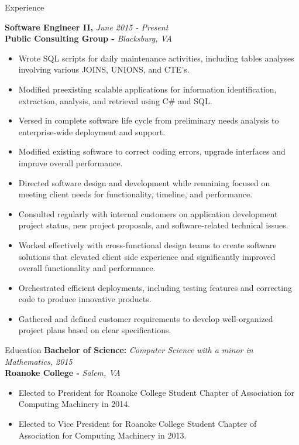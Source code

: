 \documentclass{resume} %
\begin{document}
\begin{rSection}{Experience}

{\bf Software Engineer II, }{\em June 2015 - Present} 
\\
{\bf Public Consulting Group -  }{\em Blacksburg, VA}
\begin{itemize}
\item Wrote SQL scripts for daily maintenance activities, including tables analyses involving various JOINS, UNIONS, and CTE's.
\item Modified preexisting scalable applications for information identification, extraction, analysis, and retrieval using C\# and SQL.
\item Versed in complete software life cycle from preliminary needs analysis to enterprise-wide deployment and support.
\item Modified existing software to correct coding errors, upgrade interfaces and improve overall performance.
\item Directed software design and development while remaining focused on meeting client needs for functionality, timeline, and performance.
\item Consulted regularly with internal customers on application development project status, new project proposals, and software-related technical issues.
\item Worked effectively with cross-functional design teams to create software solutions that elevated client side experience and significantly improved overall functionality and performance.
\item Orchestrated efficient deployments, including testing features and correcting code to produce innovative products.
\item Gathered and defined customer requirements to develop well-organized project plans based on clear specifications.
\end{itemize}
\end{rSection}

\begin{rSection}{Education}
{\bf Bachelor of Science: }{\em Computer Science with a minor in Mathematics, 2015} 
\\
{\bf Roanoke College -  }{\em Salem, VA}
\begin{itemize}
\item Elected to President for Roanoke College Student Chapter of Association for Computing Machinery in 2014.
\item Elected to Vice President for Roanoke College Student Chapter of Association for Computing Machinery in 2013.
\end{itemize}
\end{rSection}
\end{document}

